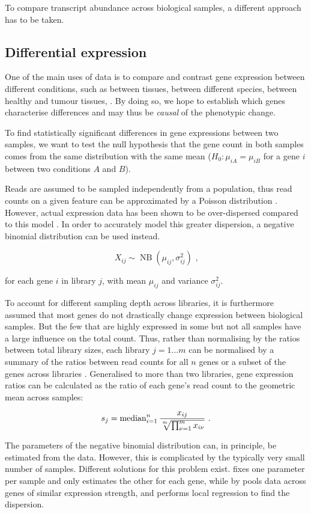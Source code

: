 To compare transcript abundance across biological samples, a different approach
has to be taken.

\subsection{Differential expression}

One of the main uses of \rnaseq data is to compare and contrast gene expression
between different conditions, such as between tissues, between different
species, between healthy and tumour tissues, \etc. By doing so, we hope to
establish which genes characterise differences and may thus be \emph{causal} of
the phenotypic change.

To find statistically significant differences in gene expressions between two
samples, we want to test the null hypothesis that the gene count in both samples
comes from the same distribution with the same mean (\(H_0: \mu_{iA} =
\mu_{iB}\) for a gene \(i\) between two conditions \(A\) and \(B\)).

Reads are assumed to be sampled independently from a population, thus read
counts on a given feature can be approximated by a Poisson distribution
\citep{Mortazavi:2008, Marioni:2008}. However, actual expression data has been
shown to be over-dispersed compared to this model \citep{Robinson:2007}. In
order to accurately model this greater dispersion, a negative binomial
distribution can be used instead.

\begin{equation}
    X_{ij} \sim \operatorname{NB}(\mu_{ij}, \sigma^2_{ij}) \text{\ ,}
\end{equation}

for each gene \(i\) in library \(j\), with mean \(\mu_{ij}\) and variance
\(\sigma^2_{ij}\).

To account for different sampling depth across libraries, it is furthermore
assumed that most genes do not drastically change expression between biological
samples. But the few that are highly expressed in some but not all samples have
a large influence on the total count. Thus, rather than normalising by the
ratios between total library sizes, each library \(j = 1 \dots m\) can be
normalised by a summary of the ratios between read counts for all \(n\) genes or
a subset of the genes across libraries \citep{Robinson:2010a,Anders:2010}.
Generalised to more than two libraries, gene expression ratios can be calculated
as the ratio of each gene’s read count to the geometric mean across samples:

\begin{equation}
    s_j = \operatorname{median}_{i = 1}^n
        \frac{x_{ij}}{\sqrt[\uproot{2}m]{\prod_{\nu = 1}^m x_{i\nu}}}
        \text{\ .}
\end{equation}

The parameters of the negative binomial distribution can, in principle, be
estimated from the data. However, this is complicated by the typically very
small number of samples. Different solutions for this problem exist.
 \citep{Robinson:2010} fixes one parameter per sample and only
estimates the other for each gene, while  by \citet{Anders:2010}
pools data across genes of similar expression strength, and performs local
regression to find the dispersion.

